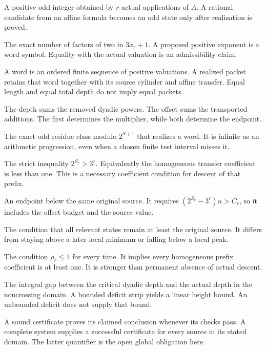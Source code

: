 \begin{description}[style=nextline,leftmargin=0pt,labelindent=0pt]
\item[Odd state $x_r$]
A positive odd integer obtained by $r$ actual applications of $A$. A rational candidate from an affine formula becomes an odd state only after realization is proved.
\item[Valuation $a_r$]
The exact number of factors of two in $3x_r+1$. A proposed positive exponent is a word symbol. Equality with the actual valuation is an admissibility claim.
\item[Word and packet]
A word is an ordered finite sequence of positive valuations. A realized packet retains that word together with its source cylinder and affine transfer. Equal length and equal total depth do not imply equal packets.
\item[Depth $S_r$ and offset $C_r$]
The depth sums the removed dyadic powers. The offset sums the transported additions. The first determines the multiplier, while both determine the endpoint.
\item[Cylinder]
The exact odd residue class modulo $2^{S+1}$ that realizes a word. It is infinite as an arithmetic progression, even when a chosen finite test interval misses it.
\item[Coefficient crossing]
The strict inequality $2^{S_r}>3^r$. Equivalently the homogeneous transfer coefficient is less than one. This is a necessary coefficient condition for descent of that prefix.
\item[Actual descent]
An endpoint below the same original source. It requires $(2^{S_r}-3^r)n>C_r$, so it includes the offset budget and the source value.
\item[Source floor]
The condition that all relevant states remain at least the original source. It differs from staying above a later local minimum or falling below a local peak.
\item[Permanent coefficient noncrossing]
The condition $\rho_r\le1$ for every time. It implies every homogeneous prefix coefficient is at least one. It is stronger than permanent absence of actual descent.
\item[Deficit $d_r$]
The integral gap between the critical dyadic depth and the actual depth in the noncrossing domain. A bounded deficit strip yields a linear height bound. An unbounded deficit does not supply that bound.
\item[Sound certificate and complete certificate system]
A sound certificate proves its claimed conclusion whenever its checks pass. A complete system supplies a successful certificate for every source in its stated domain. The latter quantifier is the open global obligation here.
\end{description}

